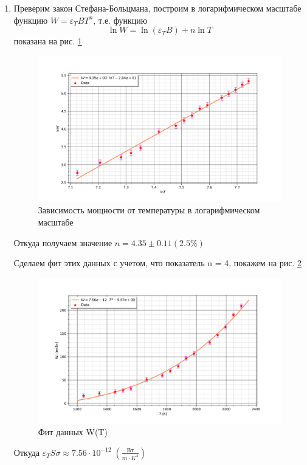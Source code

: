 \documentclass[a4paper]{article}
\begin{document}
\begin{enumerate}
    \item Преверим закон Стефана-Больцмана, построим в логарифмическом масштабе функцию $W = \varepsilon_T B T^n$,
    т.е. функцию
    $$\ln{W} = \ln{(\varepsilon_T B)} + n \ln{T}$$
    показана на рис. \ref{graph2}
    \begin{figure}[H]
        \begin{center}
        \includegraphics[scale = 0.5]{lnW.png}
        \caption{Зависимость мощности от температуры в логарифмическом масштабе}
        \label{graph2}
        \end{center}
    \end{figure}
    Откуда получаем значение $n = 4.35 \pm 0.11 (2.5 \%)$ \par 
    Сделаем фит этих данных с учетом, что показатель n = 4, покажем на рис. \ref{graph3}
    \begin{figure}[H]
        \begin{center}
        \includegraphics[scale = 0.5]{W(t)fit.png}
        \caption{Фит данных W(T)}
        \label{graph3}
        \end{center}
    \end{figure}
    Откуда $\varepsilon_T S \sigma \approx 7.56 \cdot 10^{-12} \; \left ( \frac{\text{Вт}}{m \cdot K^4} \right )$


\end{enumerate}
\end{document}
